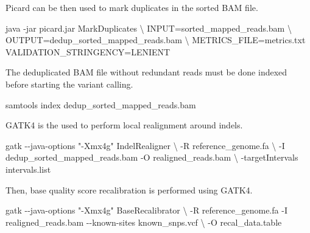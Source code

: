 \documentclass[
]{book}
\newenvironment{Shaded}{\begin{snugshade}}{\end{snugshade}}
\newcommand{\AttributeTok}[1]{\textcolor[rgb]{0.13,0.29,0.53}{#1}}
\newcommand{\DataTypeTok}[1]{\textcolor[rgb]{0.13,0.29,0.53}{#1}}
\newcommand{\ExtensionTok}[1]{#1}
\newcommand{\NormalTok}[1]{#1}
\newcommand{\StringTok}[1]{\textcolor[rgb]{0.31,0.60,0.02}{#1}}
\begin{document}
\normalsize

Picard can be then used to mark duplicates in the sorted BAM file.
\small

\begin{Shaded}
\begin{Highlighting}[]
\ExtensionTok{java} \AttributeTok{{-}jar}\NormalTok{ picard.jar MarkDuplicates }\DataTypeTok{\textbackslash{}}
\NormalTok{      INPUT=sorted\_mapped\_reads.bam }\DataTypeTok{\textbackslash{}}
\NormalTok{      OUTPUT=dedup\_sorted\_mapped\_reads.bam }\DataTypeTok{\textbackslash{}}
\NormalTok{      METRICS\_FILE=metrics.txt VALIDATION\_STRINGENCY=LENIENT}
\end{Highlighting}
\end{Shaded}

\normalsize

The deduplicated BAM file without redundant reads must be done indexed before starting the variant calling.
\small

\begin{Shaded}
\begin{Highlighting}[]
\ExtensionTok{samtools}\NormalTok{ index dedup\_sorted\_mapped\_reads.bam}
\end{Highlighting}
\end{Shaded}

\normalsize

GATK4 is the used to perform local realignment around indels.
\small

\begin{Shaded}
\begin{Highlighting}[]
\ExtensionTok{gatk} \AttributeTok{{-}{-}java{-}options} \StringTok{"{-}Xmx4g"}\NormalTok{ IndelRealigner }\DataTypeTok{\textbackslash{}}
      \AttributeTok{{-}R}\NormalTok{ reference\_genome.fa }\DataTypeTok{\textbackslash{}}
      \AttributeTok{{-}I}\NormalTok{ dedup\_sorted\_mapped\_reads.bam}
      \ExtensionTok{{-}O}\NormalTok{ realigned\_reads.bam }\DataTypeTok{\textbackslash{}}
      \AttributeTok{{-}targetIntervals}\NormalTok{ intervals.list}
\end{Highlighting}
\end{Shaded}

\normalsize

Then, base quality score recalibration is performed using GATK4.
\small

\begin{Shaded}
\begin{Highlighting}[]
\ExtensionTok{gatk} \AttributeTok{{-}{-}java{-}options} \StringTok{"{-}Xmx4g"}\NormalTok{ BaseRecalibrator }\DataTypeTok{\textbackslash{}}
      \AttributeTok{{-}R}\NormalTok{ reference\_genome.fa}
      \ExtensionTok{{-}I}\NormalTok{ realigned\_reads.bam}
      \ExtensionTok{{-}{-}known{-}sites}\NormalTok{ known\_snps.vcf }\DataTypeTok{\textbackslash{}}
      \AttributeTok{{-}O}\NormalTok{ recal\_data.table}
\end{Highlighting}
\end{Shaded}
\end{document}
